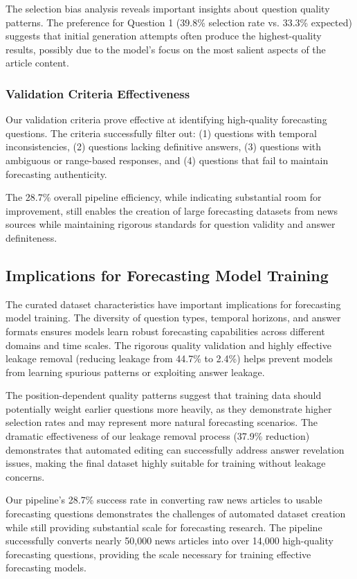 The selection bias analysis reveals important insights about question quality patterns. The preference for Question 1 (39.8\% selection rate vs. 33.3\% expected) suggests that initial generation attempts often produce the highest-quality results, possibly due to the model's focus on the most salient aspects of the article content.

\subsubsection{Validation Criteria Effectiveness}
Our validation criteria prove effective at identifying high-quality forecasting questions. The criteria successfully filter out: (1) questions with temporal inconsistencies, (2) questions lacking definitive answers, (3) questions with ambiguous or range-based responses, and (4) questions that fail to maintain forecasting authenticity.

The 28.7\% overall pipeline efficiency, while indicating substantial room for improvement, still enables the creation of large forecasting datasets from news sources while maintaining rigorous standards for question validity and answer definiteness.

\subsection{Implications for Forecasting Model Training}
\label{subsec:training_implications}

The curated dataset characteristics have important implications for forecasting model training. The diversity of question types, temporal horizons, and answer formats ensures models learn robust forecasting capabilities across different domains and time scales. The rigorous quality validation and highly effective leakage removal (reducing leakage from 44.7\% to 2.4\%) helps prevent models from learning spurious patterns or exploiting answer leakage.

The position-dependent quality patterns suggest that training data should potentially weight earlier questions more heavily, as they demonstrate higher selection rates and may represent more natural forecasting scenarios. The dramatic effectiveness of our leakage removal process (37.9\% reduction) demonstrates that automated editing can successfully address answer revelation issues, making the final dataset highly suitable for training without leakage concerns.

Our pipeline's 28.7\% success rate in converting raw news articles to usable forecasting questions demonstrates the challenges of automated dataset creation while still providing substantial scale for forecasting research. The pipeline successfully converts nearly 50,000 news articles into over 14,000 high-quality forecasting questions, providing the scale necessary for training effective forecasting models. 